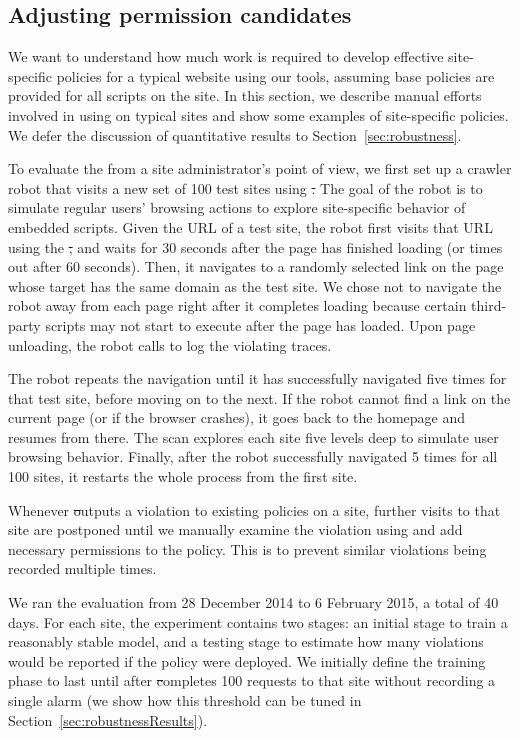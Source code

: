\subsection{Adjusting permission candidates}\label{sec:usingPG}

We want to understand how much work is required to develop effective
site-specific policies for a typical website using our tools, assuming
base policies are provided for all scripts on the site.  In this
section, we describe manual efforts involved in using \pg on typical
sites and show some examples of site-specific policies. We defer the
discussion of quantitative results to Section~\ref{sec:robustness}.

To evaluate the \pg from a site administrator's point of view, we first
set up a crawler robot that visits a new set of 100 test sites using
\st.  The goal of the robot is to simulate regular users' browsing
actions to explore site-specific behavior of embedded scripts.  Given
the URL of a test site, the robot first visits that URL using the \st,
and waits for 30 seconds after the page has finished loading (or times
out after 60 seconds).  Then, it navigates to a randomly selected link
on the page whose target has the same domain as the test site.  We chose
not to navigate the robot away from each page right after it completes
loading because certain third-party scripts may not start to execute
after the page has loaded.  Upon page unloading, the robot calls
 to log the violating traces.

The robot repeats the navigation until it has successfully navigated
five times for that test site, before moving on to the next.  If the
robot cannot find a link on the current page (or if the browser
crashes), it goes back to the homepage and resumes from there.  The scan
explores each site five levels deep to simulate user browsing behavior.
Finally, after the robot successfully navigated 5 times for all 100
sites, it restarts the whole process from the first site.

Whenever \st outputs a violation to existing policies on a site, further
visits to that site are postponed until we manually examine the violation using
\pg and add necessary permissions to the policy.  This is to prevent
similar violations being recorded multiple times.

We ran the evaluation from 28 December 2014 to 6 February 2015, a total
of 40 days.  For each site, the experiment contains two stages: an
initial stage to train a reasonably stable model, and a testing stage to
estimate how many violations would be reported if the policy were
deployed.  We initially define the training phase to last until after
\st completes 100 requests to that site without recording a single alarm
(we show how this threshold can be tuned in
Section~\ref{sec:robustnessResults}).

